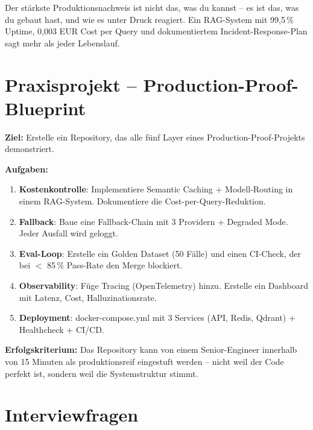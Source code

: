 \begin{merke}
Der stärkste Produktionsnachweis ist nicht das, was du kannst -- es ist das, was du gebaut hast, und wie es unter Druck reagiert. Ein RAG-System mit 99,5\,\% Uptime, 0,003 EUR Cost per Query und dokumentiertem Incident-Response-Plan sagt mehr als jeder Lebenslauf.
\end{merke}

\section{Praxisprojekt -- Production-Proof-Blueprint}

\textbf{Ziel:} Erstelle ein Repository, das alle fünf Layer eines Production-Proof-Projekts demonstriert.

\textbf{Aufgaben:}
\begin{enumerate}[leftmargin=*]
    \item \textbf{Kostenkontrolle}: Implementiere Semantic Caching + Modell-Routing in einem RAG-System. Dokumentiere die Cost-per-Query-Reduktion.
    \item \textbf{Fallback}: Baue eine Fallback-Chain mit 3 Providern + Degraded Mode. Jeder Ausfall wird geloggt.
    \item \textbf{Eval-Loop}: Erstelle ein Golden Dataset (50 Fälle) und einen CI-Check, der bei $<$ 85\,\% Pass-Rate den Merge blockiert.
    \item \textbf{Observability}: Füge Tracing (OpenTelemetry) hinzu. Erstelle ein Dashboard mit Latenz, Cost, Halluzinationsrate.
    \item \textbf{Deployment}: docker-compose.yml mit 3 Services (API, Redis, Qdrant) + Healthcheck + CI/CD.
\end{enumerate}

\textbf{Erfolgskriterium:} Das Repository kann von einem Senior-Engineer innerhalb von 15 Minuten als produktionsreif eingestuft werden -- nicht weil der Code perfekt ist, sondern weil die Systemstruktur stimmt.

\section{Interviewfragen}

